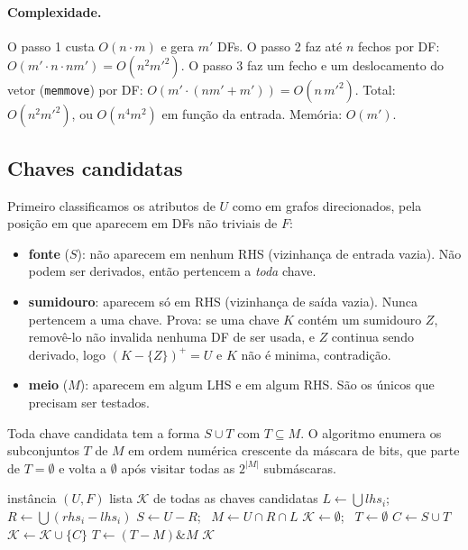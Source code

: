 \documentclass[11pt,a4paper]{article}
\newcommand{\cl}[1]{\ensuremath{#1^{+}}}
\newcommand{\cmd}[1]{\texttt{#1}}
\begin{document}
\paragraph{Complexidade.} O passo 1 custa $O(n \cdot m)$ e gera $m'$ DFs. O
passo 2 faz até $n$ fechos por DF: $O(m' \cdot n \cdot n m') = O(n^2 m'^2)$.
O passo 3 faz um fecho e um deslocamento do vetor (\cmd{memmove}) por DF:
$O(m' \cdot (n m' + m')) = O(n\,m'^2)$. Total: $O(n^2 m'^2)$, ou $O(n^4 m^2)$
em função da entrada. Memória: $O(m')$.






\subsection{Chaves candidatas}

Primeiro classificamos os atributos de $U$ como em grafos direcionados, pela
posição em que aparecem em DFs não triviais de $F$:

\begin{itemize}

    \item \textbf{fonte} ($S$): não aparecem em nenhum RHS (vizinhança de entrada
        vazia). Não podem ser derivados, então pertencem a \emph{toda} chave.

    \item \textbf{sumidouro}: aparecem só em RHS (vizinhança de saída vazia).
        Nunca pertencem a uma chave. Prova: se uma chave $K$ contém um sumidouro
        $Z$, removê-lo não invalida nenhuma DF de ser usada, e $Z$ continua sendo
        derivado, logo $\cl{(K-\{Z\})} = U$ e $K$ não é minima, contradição.

    \item \textbf{meio} ($M$): aparecem em algum LHS e em algum RHS. São os
        únicos que precisam ser testados.
\end{itemize}

Toda chave candidata tem a forma $S \cup T$ com $T \subseteq M$. O algoritmo
enumera os subconjuntos $T$ de $M$ em ordem numérica crescente da máscara de
bits, que parte de $T = \emptyset$ e volta a $\emptyset$ após visitar todas
as $2^{|M|}$ submáscaras.

\begin{algorithm}[H]
    \caption{Chaves candidatas (\cmd{keys})}
    \begin{algorithmic}[1]
        \Require instância $(U, F)$
        \Ensure lista $\mathcal{K}$ de todas as chaves candidatas
        \State $L \gets \bigcup \mathit{lhs}_i$; \ $R \gets \bigcup (\mathit{rhs}_i - \mathit{lhs}_i)$
        \State $S \gets U - R$; \ $M \gets U \cap R \cap L$
        \State $\mathcal{K} \gets \emptyset$; \ $T \gets \emptyset$
        \Repeat
        \State $C \gets S \cup T$
        \If{$\nexists K \in \mathcal{K} : K \subseteq C$ \textbf{e} $\cl{C} = U$}
        \State $\mathcal{K} \gets \mathcal{K} \cup \{C\}$
        \EndIf
        \State $T \gets (T - M) \mathbin{\&} M$ 
        \State \Return $\mathcal{K}$
    \end{algorithmic}
\end{algorithm}
\end{document}
